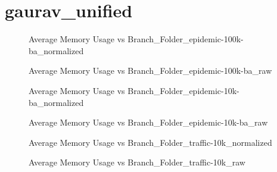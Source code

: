 \section{gaurav\_unified}
\begin{figure}[H]
\centering

\caption{Average Memory Usage vs Branch\_Folder\_epidemic-100k-ba\_normalized}
\end{figure}
\vspace{1cm}
\begin{figure}[H]
\centering

\caption{Average Memory Usage vs Branch\_Folder\_epidemic-100k-ba\_raw}
\end{figure}
\vspace{1cm}
\newpage
\begin{figure}[H]
\centering

\caption{Average Memory Usage vs Branch\_Folder\_epidemic-10k-ba\_normalized}
\end{figure}
\vspace{1cm}
\begin{figure}[H]
\centering

\caption{Average Memory Usage vs Branch\_Folder\_epidemic-10k-ba\_raw}
\end{figure}
\vspace{1cm}
\newpage
\begin{figure}[H]
\centering

\caption{Average Memory Usage vs Branch\_Folder\_traffic-10k\_normalized}
\end{figure}
\vspace{1cm}
\begin{figure}[H]
\centering

\caption{Average Memory Usage vs Branch\_Folder\_traffic-10k\_raw}
\end{figure}
